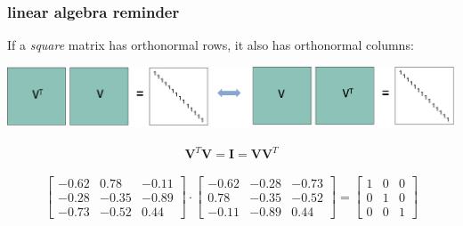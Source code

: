 \documentclass[compress]{beamer}
\newcommand{\bv}[1]{\mathbf{#1}}
\begin{document}
%
%	

\begin{frame}[t]
	\frametitle{linear algebra reminder}
	If a \emph{square} matrix has orthonormal rows, it also has orthonormal columns:
	\begin{center}
		\includegraphics[width=\textwidth]{orth_square.png}
	\end{center}
	\begin{align*}
		\bv{V}^T\bv{V} = \bv{I} = \bv{V}\bv{V}^T
	\end{align*}
	
	\begin{align*}
		 \begin{bmatrix}
		 -0.62  &  0.78 &  -0.11\\
		-0.28   & -0.35 &  -0.89 \\
		-0.73  &  -0.52  &  0.44
		\end{bmatrix}
	\cdot 
		\begin{bmatrix}
   -0.62 &   -0.28 &   -0.73\\
0.78 &   -0.35  & -0.52\\
-0.11 &  -0.89 &    0.44
	\end{bmatrix}
= 		 \begin{bmatrix}
	1 &  0 &  0\\
	0   & 1 &  0 \\
	0  &  0  &  1
\end{bmatrix}
	\end{align*}
\end{frame}
\end{document}
